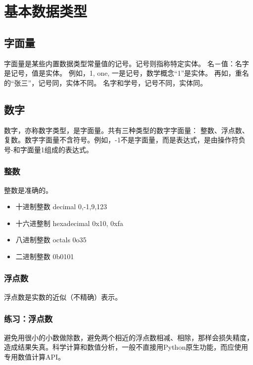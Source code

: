 \chapter{基本数据类型}
\section{字面量}
字面量是某些内置数据类型常量值的记号。记号则指称特定实体。  名－值：名字是记号，值是实体。 例如，1, one, 一是记号，数学概念“1”是实体。  再如，重名的“张三”，记号同，实体不同。 名字和学号，记号不同，实体同。

\section{数字}

数字，亦称数字类型，是字面量。共有三种类型的数字字面量： 整数、浮点数、复数。数字字面量不含符号。例如，-1不是字面量，而是表达式，是由操作符负号-和字面量1组成的表达式。
\subsection{整数}
整数是准确的。
\begin{itemize}
\item 十进制整数 decimal 0,-1,9,123
\item 十六进整制 hexadecimal 0x10, 0xfa
\item 八进制整数 octals 0o35
\item 二进制整数 0b0101
\end{itemize}
\subsection{浮点数}
浮点数是实数的近似（不精确）表示。
\subsection{练习：浮点数}
避免用很小的小数做除数，避免两个相近的浮点数相减、相除，那样会损失精度，造成结果失真。科学计算和数值分析，一般不直接用Python原生功能，而应使用专用数值计算API。
